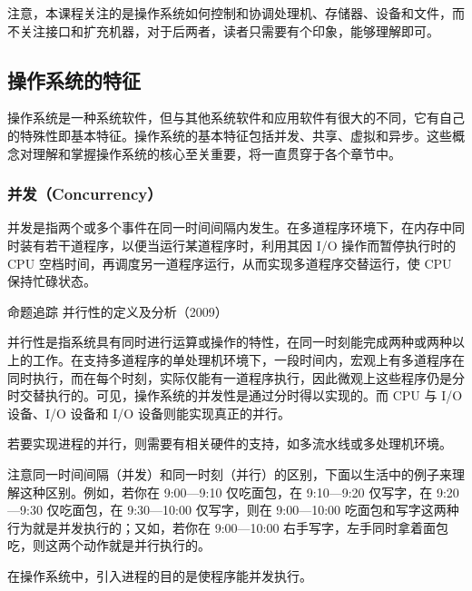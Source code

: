 \documentclass{ctexbook}
\begin{document}
	注意，本课程关注的是操作系统如何控制和协调处理机、存储器、设备和文件，而不关注接口和扩充机器，对于后两者，读者只需要有个印象，能够理解即可。
	
	\subsection{操作系统的特征}
	操作系统是一种系统软件，但与其他系统软件和应用软件有很大的不同，它有自己的特殊性即基本特征。操作系统的基本特征包括并发、共享、虚拟和异步。这些概念对理解和掌握操作系统的核心至关重要，将一直贯穿于各个章节中。
	
	\subsubsection{并发（Concurrency）}
	并发是指两个或多个事件在同一时间间隔内发生。在多道程序环境下，在内存中同时装有若干道程序，以便当运行某道程序时，利用其因 I/O 操作而暂停执行时的 CPU 空档时间，再调度另一道程序运行，从而实现多道程序交替运行，使 CPU 保持忙碌状态。
	
	\colorbox{gray!20}{命题追踪 \enspace 并行性的定义及分析（2009）}
	
	并行性是指系统具有同时进行运算或操作的特性，在同一时刻能完成两种或两种以上的工作。在支持多道程序的单处理机环境下，一段时间内，宏观上有多道程序在同时执行，而在每个时刻，实际仅能有一道程序执行，因此微观上这些程序仍是分时交替执行的。可见，操作系统的并发性是通过分时得以实现的。而 CPU 与 I/O 设备、I/O 设备和 I/O 设备则能实现真正的并行。
	
	若要实现进程的并行，则需要有相关硬件的支持，如多流水线或多处理机环境。
	
	注意同一时间间隔（并发）和同一时刻（并行）的区别，下面以生活中的例子来理解这种区别。例如，若你在 9:00—9:10 仅吃面包，在 9:10—9:20 仅写字，在 9:20—9:30 仅吃面包，在 9:30—10:00 仅写字，则在 9:00—10:00 吃面包和写字这两种行为就是并发执行的；又如，若你在 9:00—10:00 右手写字，左手同时拿着面包吃，则这两个动作就是并行执行的。
	
	在操作系统中，引入进程的目的是使程序能并发执行。
	
\end{document}
